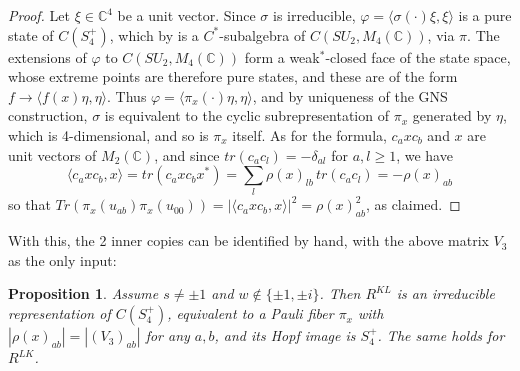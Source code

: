 \documentclass[11pt]{amsart}
\newtheorem{proposition}[theorem]{Proposition}
\begin{document}
\begin{proof}
Let $\xi\in\mathbb C^4$ be a unit vector. Since $\sigma$ is irreducible, $\varphi=\langle\sigma(\cdot)\xi,\xi\rangle$ is a pure state of $C(S_4^+)$, which by \cite{bc} is a $C^*$-subalgebra of $C(SU_2,M_4(\mathbb C))$, via $\pi$. The extensions of $\varphi$ to $C(SU_2,M_4(\mathbb C))$ form a weak$^*$-closed face of the state space, whose extreme points are therefore pure states, and these are of the form $f\to\langle f(x)\eta,\eta\rangle$. Thus $\varphi=\langle\pi_x(\cdot)\eta,\eta\rangle$, and by uniqueness of the GNS construction, $\sigma$ is equivalent to the cyclic subrepresentation of $\pi_x$ generated by $\eta$, which is 4-dimensional, and so is $\pi_x$ itself. As for the formula, $c_axc_b$ and $x$ are unit vectors of $M_2(\mathbb C)$, and since $tr(c_ac_l)=-\delta_{al}$ for $a,l\geq1$, we have
$$\langle c_axc_b,x\rangle=tr(c_axc_bx^*)=\sum_l\rho(x)_{lb}\,tr(c_ac_l)=-\rho(x)_{ab}$$
so that $Tr(\pi_x(u_{ab})\pi_x(u_{00}))=|\langle c_axc_b,x\rangle|^2=\rho(x)_{ab}^2$, as claimed.
\end{proof}

\noindent With this, the 2 inner copies can be identified by hand, with the above matrix $V_3$ as the only input:

\begin{proposition}\label{prop:rkl}
Assume $s\neq\pm1$ and $w\notin\{\pm1,\pm i\}$. Then $R^{KL}$ is an irreducible representation of $C(S_4^+)$, equivalent to a Pauli fiber $\pi_x$ with $|\rho(x)_{ab}|=|(V_3)_{ab}|$ for any $a,b$, and its Hopf image is $S_4^+$. The same holds for $R^{LK}$.
\end{proposition}
\end{document}
